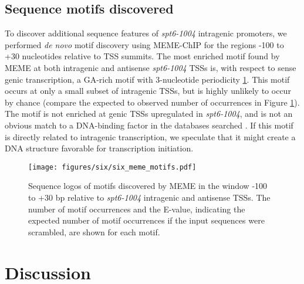 \subsection{Sequence motifs discovered}

To discover additional sequence features of \textit{spt6-1004} intragenic promoters, we performed \textit{de novo} motif discovery using MEME-ChIP \citep{machanick2011} for the regions -100 to +30 nucleotides relative to TSS summits.
The most enriched motif found by MEME at both intragenic and antisense \textit{spt6-1004} TSSs is, with respect to sense genic transcription, a GA-rich motif with 3-nucleotide periodicity \ref{fig:six_meme_motifs}.
This motif occurs at only a small subset of intragenic TSSs, but is highly unlikely to occur by chance (compare the expected to observed number of occurrences in Figure \ref{fig:six_meme_motifs}).
The motif is not enriched at genic TSSs upregulated in \textit{spt6-1004}, and is not an obvious match to a DNA-binding factor in the databases searched \citep{deboer2011,macisaac2006,newburger2008,pachkov2013,teixeira2017,zhu1999,weirauch2014}.
If this motif is directly related to intragenic transcription, we speculate that it might create a DNA structure favorable for transcription initiation.

\begin{figure}[h]
    \centering
    \texttt{[image: figures/six/six\_meme\_motifs.pdf]}
    \caption[Sequence logos of motifs discovered by MEME upstream of \textit{spt6-1004}-induced intragenic and antisense TSSs.]{Sequence logos of motifs discovered by MEME \citep{bailey2015} in the window -100 to +30 bp relative to \textit{spt6-1004} intragenic and antisense TSSs. The number of motif occurrences and the E-value, indicating the expected number of motif occurrences if the input sequences were scrambled, are shown for each motif.}
    \label{fig:six_meme_motifs}
\end{figure}

\section{Discussion}


